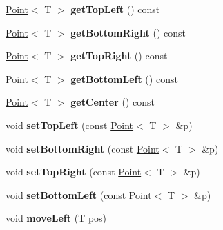 \begin{DoxyCompactItemize}
\item 
\hypertarget{class_box_ac0f698d9054c81ce3f0b9e45b208aa83}{
\hyperlink{class_point}{Point}$<$ T $>$ {\bfseries getTopLeft} () const }
\label{class_box_ac0f698d9054c81ce3f0b9e45b208aa83}

\item 
\hypertarget{class_box_a1cbff4ee05e798b43cda5ca603d004e7}{
\hyperlink{class_point}{Point}$<$ T $>$ {\bfseries getBottomRight} () const }
\label{class_box_a1cbff4ee05e798b43cda5ca603d004e7}

\item 
\hypertarget{class_box_a61afdde64f205f189aeff219bac2db24}{
\hyperlink{class_point}{Point}$<$ T $>$ {\bfseries getTopRight} () const }
\label{class_box_a61afdde64f205f189aeff219bac2db24}

\item 
\hypertarget{class_box_a0e7e1c5254740268ba77c9a0b27a4f06}{
\hyperlink{class_point}{Point}$<$ T $>$ {\bfseries getBottomLeft} () const }
\label{class_box_a0e7e1c5254740268ba77c9a0b27a4f06}

\item 
\hypertarget{class_box_a79994cde311637abfa037fed82144376}{
\hyperlink{class_point}{Point}$<$ T $>$ {\bfseries getCenter} () const }
\label{class_box_a79994cde311637abfa037fed82144376}

\item 
\hypertarget{class_box_ae155e4095a60d21cdd3677e018ef25c9}{
void {\bfseries setTopLeft} (const \hyperlink{class_point}{Point}$<$ T $>$ \&p)}
\label{class_box_ae155e4095a60d21cdd3677e018ef25c9}

\item 
\hypertarget{class_box_adbec284811aeec462e064a28f7aaaa8c}{
void {\bfseries setBottomRight} (const \hyperlink{class_point}{Point}$<$ T $>$ \&p)}
\label{class_box_adbec284811aeec462e064a28f7aaaa8c}

\item 
\hypertarget{class_box_a87df2c9be2d8d144df1e47e1150b9132}{
void {\bfseries setTopRight} (const \hyperlink{class_point}{Point}$<$ T $>$ \&p)}
\label{class_box_a87df2c9be2d8d144df1e47e1150b9132}

\item 
\hypertarget{class_box_a228cf7f5dcfd1013b647d524a4ce5148}{
void {\bfseries setBottomLeft} (const \hyperlink{class_point}{Point}$<$ T $>$ \&p)}
\label{class_box_a228cf7f5dcfd1013b647d524a4ce5148}

\item 
\hypertarget{class_box_aa656edcbbfa8c22092bc2928e792db93}{
void {\bfseries moveLeft} (T pos)}
\label{class_box_aa656edcbbfa8c22092bc2928e792db93}


\end{DoxyCompactItemize}
